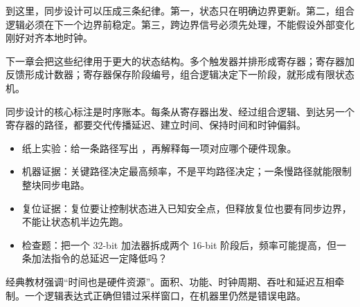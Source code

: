 到这里，同步设计可以压成三条纪律。第一，状态只在明确边界更新。第二，组合逻辑必须在下一个边界前稳定。第三，跨边界信号必须先处理，不能假设外部变化刚好对齐本地时钟。

下一章会把这些纪律用于更大的状态结构。多个触发器并排形成寄存器；寄存器加反馈形成计数器；寄存器保存阶段编号，组合逻辑决定下一阶段，就形成有限状态机。

\begin{classicnote}
同步设计的核心标注是时序账本。每条从寄存器出发、经过组合逻辑、到达另一个寄存器的路径，都要交代传播延迟、建立时间、保持时间和时钟偏斜。

\begin{itemize}
\item 纸上实验：给一条路径写出 ，再解释每一项对应哪个硬件现象。
\item 机器证据：关键路径决定最高频率，不是平均路径决定；一条慢路径就能限制整块同步电路。
\item 复位证据：复位要让控制状态进入已知安全点，但释放复位也要有同步边界，不能让状态机半边先跑。
\item 检查题：把一个 32-bit 加法器拆成两个 16-bit 阶段后，频率可能提高，但一条加法指令的总延迟一定降低吗？
\end{itemize}

经典教材强调“时间也是硬件资源”。面积、功能、时钟周期、吞吐和延迟互相牵制。一个逻辑表达式正确但错过采样窗口，在机器里仍然是错误电路。
\end{classicnote}
